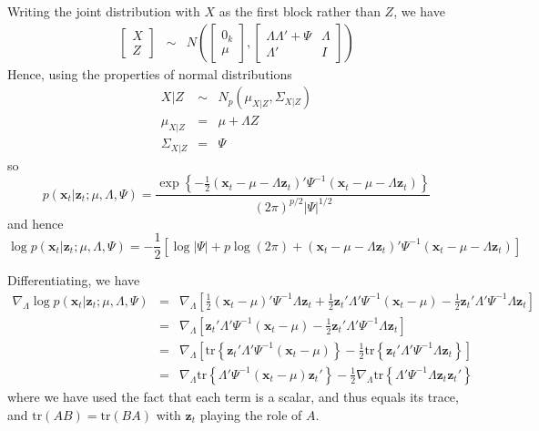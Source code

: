 \documentclass[12pt]{article}
\theoremstyle{definition}
\begin{document}
Writing the joint distribution with $X$ as the first block rather than $Z$, we have
	\begin{eqnarray*}
		\left[\begin{array}{c}
			X\\ Z
		\end{array}\right] 
		&\sim&  N\left(
		\left[\begin{array}{c}
			0_k \\ \mu
	\end{array}\right], 
		\left[\begin{array}{cc}
			 \Lambda \Lambda' + \Psi & \Lambda\\
			 \Lambda' & I
		\end{array} \right] \right)
	\end{eqnarray*}
Hence, using the properties of normal distributions
	\begin{eqnarray*}
		X | Z &\sim& N_p(\mu_{X|Z}, \Sigma_{X|Z})\\
		\mu_{X|Z} &=& \mu + \Lambda Z \\
		\Sigma_{X|Z} &=& \Psi
	\end{eqnarray*}
so 
	$$p(\textbf{x}_t| \textbf{z}_t;\mu, \Lambda, \Psi) = \frac{\exp \left\{-\frac{1}{2}(\mathbf{x}_t - \mu -  \Lambda \textbf{z}_t)' \Psi^{-1} (\mathbf{x}_t - \mu -  \Lambda \textbf{z}_t) \right\}}{{(2\pi)^{p/2}\left|\Psi \right|^{1/2}}}$$
and hence
	$$\log p(\textbf{x}_t| \textbf{z}_t;\mu, \Lambda, \Psi) = -\frac{1}{2}\left[  \log |\Psi| + p \log(2\pi) +(\mathbf{x}_t - \mu -  \Lambda \textbf{z}_t)' \Psi^{-1} (\mathbf{x}_t - \mu -  \Lambda \textbf{z}_t)\right] $$


Differentiating, we have
	\begin{eqnarray*}
		\nabla_\Lambda \log p(\textbf{x}_t| \textbf{z}_t;\mu, \Lambda, \Psi) &=&  \nabla_\Lambda \left[ \frac{1}{2}(\mathbf{x}_t - \mu)' \Psi^{-1} \Lambda \mathbf{z}_t + \frac{1}{2} \mathbf{z}_t' \Lambda'\Psi^{-1} (\mathbf{x}_t - \mu)- \frac{1}{2} \mathbf{z}_t' \Lambda' \Psi^{-1} \Lambda \mathbf{z}_t \right] \\
		&=& \nabla_\Lambda \left[  \mathbf{z}_t' \Lambda'\Psi^{-1} (\mathbf{x}_t - \mu)- \frac{1}{2} \mathbf{z}_t' \Lambda' \Psi^{-1} \Lambda \mathbf{z}_t \right]\\
		&=& \nabla_\Lambda \left[  \mbox{tr}\left\{\mathbf{z}_t' \Lambda'\Psi^{-1} (\mathbf{x}_t - \mu)\right\}- \frac{1}{2} \mbox{tr}\left\{ \mathbf{z}_t' \Lambda' \Psi^{-1} \Lambda \mathbf{z}_t \right\}\right]\\
		&=& \nabla_\Lambda \mbox{tr}\left\{ \Lambda'\Psi^{-1} (\mathbf{x}_t - \mu)\mathbf{z}_t'\right\}- \frac{1}{2} \nabla_\Lambda \mbox{tr}\left\{  \Lambda' \Psi^{-1} \Lambda \mathbf{z}_t \mathbf{z}_t'\right\}
	\end{eqnarray*}
where we have used the fact that each term is a scalar, and thus equals its trace, and $\mbox{tr}(AB) = \mbox{tr}(BA)$ with $\mathbf{z}_t$ playing the role of $A$.
\end{document}
